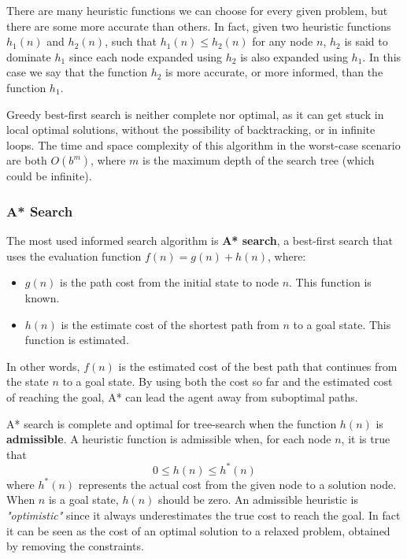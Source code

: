 \documentclass{article}
\begin{document}
There are many heuristic functions we can choose for every given problem, but there are some more accurate than others. In fact, given two heuristic functions $h_1(n)$ and $h_2(n)$, such that $h_1(n)\le h_2(n)$ for any node $n$, $h_2$ is said to dominate $h_1$ since each node expanded using $h_2$ is also expanded using $h_1$. In this case we say that the function $h_2$ is more accurate, or more informed, than the function $h_1$.

Greedy best-first search is neither complete nor optimal, as it can get stuck in local optimal solutions, without the possibility of backtracking, or in infinite loops. The time and space complexity of this algorithm in the worst-case scenario are both $O(b^m)$, where $m$ is the maximum depth of the search tree (which could be infinite).

\subsubsection{A* Search}
The most used informed search algorithm is \textbf{A* search}, a best-first search that uses the evaluation function $f(n) = g(n) + h(n)$, where:
\begin{itemize}
    \item $g(n)$ is the path cost from the initial state to node $n$. This function is known.
    \item $h(n)$ is the estimate cost of the shortest path from $n$ to a goal state. This function is estimated.
\end{itemize}

\noindent
In other words, $f(n)$ is the estimated cost of the best path that continues from the state $n$ to a goal state. By using both the cost so far and the estimated cost of reaching the goal, A* can lead the agent away from suboptimal paths.

A* search is complete and optimal for tree-search when the function $h(n)$ is \textbf{admissible}. A heuristic function is admissible when, for each node $n$, it is true that 
    $$0 \le h(n) \le h^*(n)$$
where $h^*(n)$ represents the actual cost from the given node to a solution node. When $n$ is a goal state, $h(n)$ should be zero. An admissible heuristic is \textit{"optimistic"} since it always underestimates the true cost to reach the goal. In fact it can be seen as the cost of an optimal solution to a relaxed problem, obtained by removing the constraints.
\end{document}
